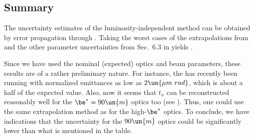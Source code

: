 


\subsection{Summary}

The uncertainty estimates of the luminosity-independent method can be obtained by error propagation through . Taking the worst cases of the extrapolations from  and the other parameter uncertainties from Sec.~6.3 in  yields .


Since we have used the nominal (expected) optics and beam parameters, these results are of a rather preliminary nature. For instance, the  has recently been running with normalized emittances as low as $2 \un{\mu m\ rad}$, which is about a half of the expected value. Also, now it seems that $t_x$ can be reconstructed reasonably well for the $\be^* = 90\un{m}$ optics too (see ). Thus, one could use the same extrapolation method as for the high-$\be^*$ optics. To conclude, we have indications that the uncertainty for the $90\un{m}$ optics could be significantly lower than what is mentioned in the table.
